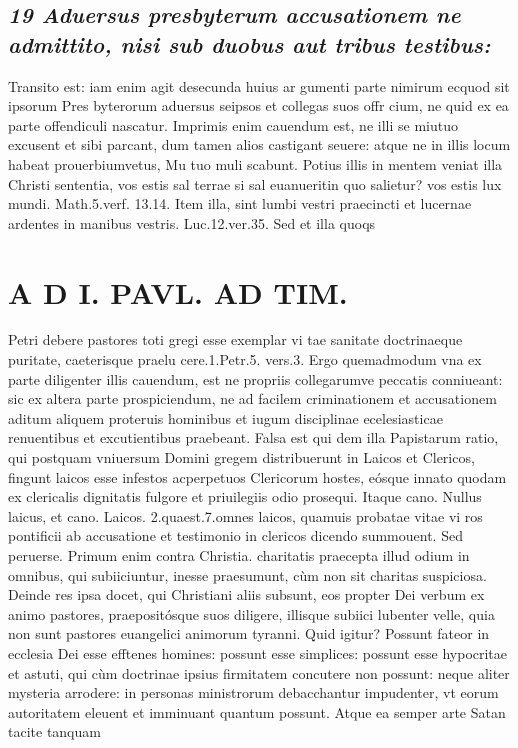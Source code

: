\documentclass{article}
\begin{document}
\begin{pages}
\subsection*{\textit{19 Aduersus presbyterum accusationem ne admittito, nisi sub duobus aut tribus testibus: }}\pstart Transito est: iam enim agit desecunda huius ar gumenti parte nimirum ecquod sit ipsorum Pres byterorum aduersus seipsos et collegas suos offr cium, ne quid ex ea parte offendiculi nascatur. Imprimis enim cauendum est, ne illi se miutuo excusent et sibi parcant, dum tamen alios castigant seuere: atque ne in illis locum habeat prouerbiumvetus, Mu tuo muli scabunt. Potius illis in mentem veniat illa Christi sententia, vos estis sal terrae si sal euanueritin quo salietur? vos estis lux mundi. Math.5.verf. 13.14. Item illa, sint lumbi vestri praecincti et lucernae ardentes in manibus vestris. Luc.12.ver.35. Sed et illa quoqs  \pend
\section*{A D I. PAVL. AD TIM. }
\marginpar{[ p.312 ]}\pstart Petri debere pastores toti gregi esse exemplar vi tae sanitate doctrinaeque puritate, caeterisque  praelu cere.1.Petr.5. vers.3. Ergo quemadmodum vna ex parte diligenter illis cauendum, est ne propriis collegarumve peccatis conniueant: sic ex altera parte prospiciendum, ne ad facilem criminationem et accusationem aditum aliquem proteruis hominibus et iugum disciplinae ecelesiasticae renuentibus et excutientibus praebeant. Falsa est qui dem illa Papistarum ratio, qui postquam vniuersum Domini gregem distribuerunt in Laicos et Clericos, fingunt laicos esse infestos acperpetuos Clericorum hostes, eósque innato quodam ex clericalis dignitatis fulgore et priuilegiis odio prosequi. Itaque cano. Nullus laicus, et cano. Laicos. 2.quaest.7.omnes laicos, quamuis probatae vitae vi ros pontificii ab accusatione et testimonio in clericos dicendo summouent. Sed peruerse. Primum enim contra Christia. charitatis praecepta illud odium in omnibus, qui subiiciuntur, inesse praesumunt, cùm non sit charitas suspiciosa. Deinde res ipsa docet, qui Christiani aliis subsunt, eos propter Dei verbum ex animo pastores, praepositósque suos diligere, illisque subiici lubenter velle, quia non sunt pastores euangelici animorum tyranni. Quid igitur? Possunt fateor in ecclesia Dei esse efftenes homines: possunt esse simplices: possunt esse hypocritae et astuti, qui cùm doctrinae ipsius firmitatem concutere non possunt: neque aliter mysteria arrodere: in personas ministrorum debacchantur impudenter, vt eorum autoritatem eleuent et imminuant quantum possunt.  \pend\pstart Atque ea semper arte Satan tacite tanquam  \pend

\end{pages}
\end{document}
